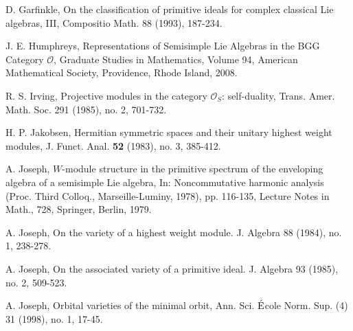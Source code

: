 \documentclass{amsart}[12pt]
\numberwithin{equation}{section}
\begin{document}
\begin{thebibliography}{99}
D. Garfinkle, On the classification of primitive ideals for complex classical Lie algebras, III, Compositio Math. 88 (1993), 187-234.


 J. E. Humphreys, {Representations of Semisimple Lie Algebras in the BGG Category $\mathscr{O}$}, Graduate Studies in Mathematics, Volume 94, American Mathematical Society, Providence, Rhode Island, 2008.


 R. S.  Irving, Projective modules in the category $\mathscr{O}_S$: self-duality,
Trans. Amer. Math. Soc. 291 (1985), no. 2, 701-732.




%
%
%
%
H. P. Jakobsen, Hermitian symmetric spaces and their unitary highest weight modules, J. Funct. Anal. {\bf 52} (1983), no. 3, 385-412.
%


A. Joseph, $W$-module structure in the primitive spectrum of the enveloping algebra of a semisimple Lie algebra, In: Noncommutative harmonic analysis (Proc. Third Colloq., Marseille-Luminy, 1978), pp. 116-135, Lecture Notes in Math., 728, Springer, Berlin, 1979.


A. Joseph, On the variety of a highest weight module. J. Algebra 88 (1984), no. 1, 238-278.


A. Joseph, On the associated variety of a primitive ideal. J. Algebra 93 (1985), no. 2, 509-523.

A. Joseph, Orbital varieties of the minimal orbit, Ann. Sci. $\rm{\acute{E}}$cole Norm.
Sup. (4) 31 (1998), no. 1, 17-45.



\end{thebibliography}
\end{document}
